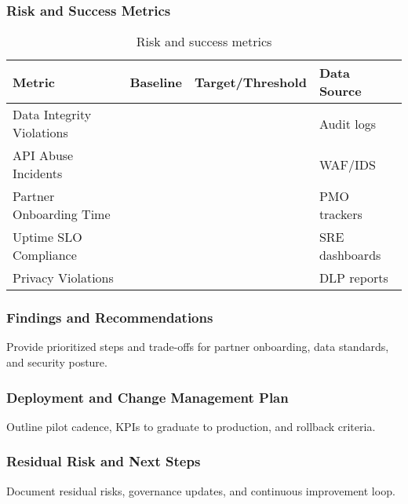 \subsubsection{Risk and Success Metrics}
\begin{table}[H]
\centering
\caption{Risk and success metrics}
\begin{tabularx}{0.98\linewidth}{l X X l}
\toprule
\textbf{Metric} & \textbf{Baseline} & \textbf{Target/Threshold} & \textbf{Data Source} \\
\midrule
Data Integrity Violations &  &  & Audit logs \\
API Abuse Incidents &  &  & WAF/IDS \\
Partner Onboarding Time &  &  & PMO trackers \\
Uptime SLO Compliance &  &  & SRE dashboards \\
Privacy Violations &  &  & DLP reports \\
\bottomrule
\end{tabularx}
\label{tab:sc_metrics}
\end{table}

\subsubsection{Findings and Recommendations}
Provide prioritized steps and trade-offs for partner onboarding, data standards, and security posture.

\subsubsection{Deployment and Change Management Plan}
Outline pilot cadence, KPIs to graduate to production, and rollback criteria.

\subsubsection{Residual Risk and Next Steps}
Document residual risks, governance updates, and continuous improvement loop.


